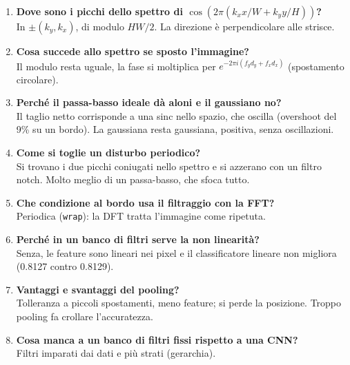 \documentclass[11pt,a4paper]{article}
\newcommand{\code}[1]{\texttt{#1}}
\begin{document}
\begin{enumerate}[leftmargin=*,itemsep=6pt]
  \item \textbf{Dove sono i picchi dello spettro di $\cos(2\pi(k_x x/W + k_y y/H))$?}\\
  In $\pm(k_y, k_x)$, di modulo $HW/2$. La direzione è perpendicolare alle strisce.
  \item \textbf{Cosa succede allo spettro se sposto l'immagine?}\\
  Il modulo resta uguale, la fase si moltiplica per $e^{-2\pi i(f_y d_y + f_x d_x)}$ (spostamento circolare).
  \item \textbf{Perché il passa-basso ideale dà aloni e il gaussiano no?}\\
  Il taglio netto corrisponde a una sinc nello spazio, che oscilla (overshoot del 9\% su un bordo). La gaussiana resta gaussiana, positiva, senza oscillazioni.
  \item \textbf{Come si toglie un disturbo periodico?}\\
  Si trovano i due picchi coniugati nello spettro e si azzerano con un filtro notch. Molto meglio di un passa-basso, che sfoca tutto.
  \item \textbf{Che condizione al bordo usa il filtraggio con la FFT?}\\
  Periodica (\code{wrap}): la DFT tratta l'immagine come ripetuta.
  \item \textbf{Perché in un banco di filtri serve la non linearità?}\\
  Senza, le feature sono lineari nei pixel e il classificatore lineare non migliora (0.8127 contro 0.8129).
  \item \textbf{Vantaggi e svantaggi del pooling?}\\
  Tolleranza a piccoli spostamenti, meno feature; si perde la posizione. Troppo pooling fa crollare l'accuratezza.
  \item \textbf{Cosa manca a un banco di filtri fissi rispetto a una CNN?}\\
  Filtri imparati dai dati e più strati (gerarchia).
\end{enumerate}
\end{document}
